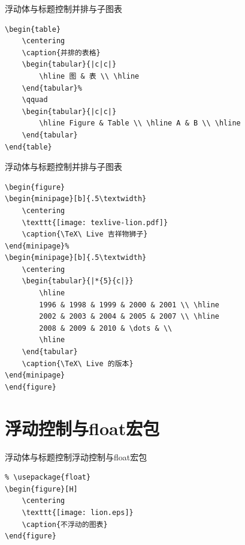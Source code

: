 \documentclass[11pt]{beamer}
\begin{document}
\begin{frame}[fragile]{浮动体与标题控制}{并排与子图表}
\begin{lstlisting}
\begin{table}
	\centering
	\caption{并排的表格}
	\begin{tabular}{|c|c|}
		\hline 图 & 表 \\ \hline
	\end{tabular}%
	\qquad
	\begin{tabular}{|c|c|}
		\hline Figure & Table \\ \hline A & B \\ \hline
	\end{tabular}
\end{table}
\end{lstlisting}
\end{frame}

\begin{frame}[fragile]{浮动体与标题控制}{并排与子图表}
\begin{lstlisting}
\begin{figure}
\begin{minipage}[b]{.5\textwidth}
	\centering
	\texttt{[image: texlive-lion.pdf]}
	\caption{\TeX\ Live 吉祥物狮子}
\end{minipage}%
\begin{minipage}[b]{.5\textwidth}
	\centering
	\begin{tabular}{|*{5}{c|}}
		\hline
		1996 & 1998 & 1999 & 2000 & 2001 \\ \hline
		2002 & 2003 & 2004 & 2005 & 2007 \\ \hline
		2008 & 2009 & 2010 & \dots & \\
		\hline
	\end{tabular}
	\caption{\TeX\ Live 的版本}
\end{minipage}
\end{figure}
\end{lstlisting}
\end{frame}

\section{浮动控制与float宏包}

\begin{frame}[fragile]{浮动体与标题控制}{浮动控制与float宏包}
\begin{lstlisting}
% \usepackage{float}
\begin{figure}[H]
	\centering
	\texttt{[image: lion.eps]}
	\caption{不浮动的图表}
\end{figure}
\end{lstlisting}
\end{frame}
\end{document}
